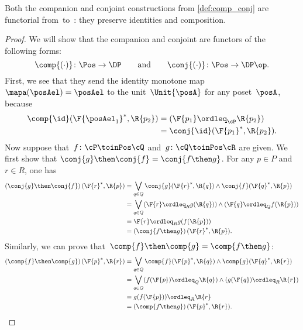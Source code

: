 \begin{lemma}
  \label{prop:comp_conj}
  Both the companion and conjoint constructions from \cref{def:comp_conj} are functorial from~\Pos to~\DP: they preserve identities and composition.
\end{lemma}
\begin{proof}
  We will show that the companion and conjoint are functors of the following forms:
  \begin{equation}
    \comp{(\cdot)}\colon\Pos\to\DP
    \qquad\text{and}\qquad
    \conj{(\cdot)}\colon\Pos\to\DP\op.
  \end{equation}
  First, we see that they send the identity monotone map~$\mapa(\posAel)=\posAel$ to the unit~$\Unit{\posA }$ for any poset~$\posA $, because
  \begin{equation}
    \begin{aligned}
      \comp{\id}(\F{\posAel_1}^*,\R{p_2})&= (\F{p_1} \ordleq_{\cP} \R{p_2})\\
      &=\conj{\id}(\F{p_1}^*,\R{p_2}).
    \end{aligned}
  \end{equation}
  Now suppose that~$f\colon  \cP \toinPos \cQ $ and~$g\colon \cQ \toinPos \cR$ are given. We first show that $\conj{g}\then\conj{f}=\conj{f\then g}$.
  For any $p\in P$ and $r\in R$, one has
  \begin{equation}
    \begin{aligned}
      \left(\conj{g}\then \conj{f}\right)(\F{r}^*,\R{p})
      &=\bigvee_{q\in Q} \conj{g}(\F{r}^*,\R{q})\wedge\conj{f}(\F{q}^*,\R{p})\\
      &=\bigvee_{q\in Q} (\F{r}\ordleq_R g(\R{q})) \wedge (\F{q}\ordleq_Q f(\R{p})) \\
      &= \F{r}\ordleq_R g(f(\R{p}))\\
      &=\left(\conj{f\then g}\right)(\F{r}^*,\R{p}).
    \end{aligned}
  \end{equation}
  Similarly, we can prove that~$\comp{f}\then \comp{g}=\comp{f\then g}$:
  \begin{equation}
    \begin{aligned}
      \left(\comp{f}\then \comp{g}\right)(\F{p}^*,\R{r})&=\bigvee_{q\in Q} \comp{f}(\F{p}^*,\R{q})\wedge\comp{g}(\F{q}^*,\R{r})\\
      &=\bigvee_{q\in Q} (f(\F{p})\ordleq_Q \R{q})\wedge (g(\F{q})\ordleq_R \R{r})\\
      &=g(f(\F{p}))\ordleq_R \R{r}\\
      &=\left(\comp{f\then g}\right)(\F{p}^*,\R{r}).
    \end{aligned}
  \end{equation}
\end{proof}

